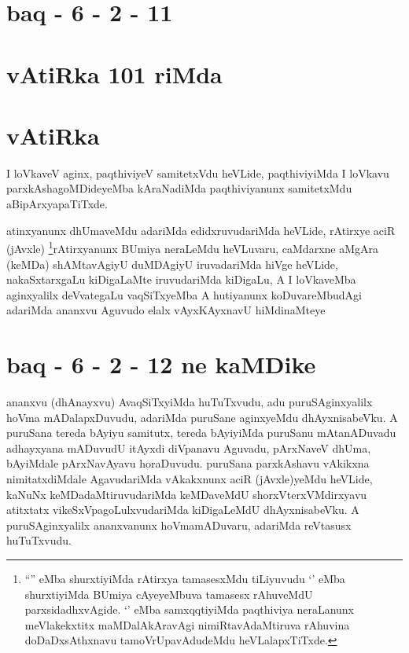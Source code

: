 
\section*{baq - 6 - 2 - 11}

\section*{vAtiRka 101 riMda}

\stext

\section*{vAtiRka}

\begin{artha}
I loVkaveV aginx, paqthiviyeV samitetxVdu heVLide, paqthiviyiMda I
loVkavu parxkAshagoMDideyeMba kAraNadiMda paqthiviyanunx samitetxMdu
aBipArxyapaTiTxde.
\end{artha}

\begin{artha}
atinxyanunx dhUmaveMdu adariMda edidxruvudariMda heVLide, rAtirxye
aciR (jAvxle) \footnote{``\stext'' eMba shurxtiyiMda rAtirxya
  tamasesxMdu tiLiyuvudu `\stext' eMba shurxtiyiMda BUmiya cAyeyeMbuva
tamasesx rAhuveMdU parxsidadhxvAgide. `\stext' eMba samxqqtiyiMda
paqthiviya neraLanunx meVlakekxtitx maMDalAkAravAgi nimiRtavAdaMtiruva
rAhuvina doDaDxsAthxnavu tamoVrUpavAdudeMdu heVLalapxTiTxde.}rAtirxyanunx BUmiya neraLeMdu heVLuvaru,
caMdarxne aMgAra (keMDa) shAMtavAgiyU duMDAgiyU iruvadariMda hiVge
heVLide, nakaSxtarxgaLu kiDigaLaMte iruvudariMda kiDigaLu, A I
loVkaveMba aginxyalilx deVvategaLu vaqSiTxyeMba A hutiyanunx
koDuvareMbudAgi adariMda ananxvu Aguvudo elalx vAyxKAyxnavU
hiMdinaMteye 
\end{artha}

\section*{baq - 6 - 2 - 12 ne kaMDike}

\stext

\begin{artha}
ananxvu (dhAnayxvu) AvaqSiTxyiMda huTuTxvudu, adu puruSAginxyalilx
hoVma mADalapxDuvudu, adariMda puruSane aginxyeMdu dhAyxnisabeVku. A
puruSana tereda bAyiyu samitutx, tereda bAyiyiMda puruSanu
mAtanADuvadu adhayxyana mADuvudU itAyxdi diVpanavu Aguvadu, pArxNaveV
dhUma, bAyiMdale pArxNavAyavu horaDuvudu. puruSana parxkAshavu
vAkikxna nimitatxdiMdale AgavudariMda vAkakxnunx aciR (jAvxle)yeMdu
heVLide, kaNuNx keMDadaMtiruvudariMda keMDaveMdU shorxVterxVMdirxyavu
atitxtatx vikeSxVpagoLulxvudariMda kiDigaLeMdU dhAyxnisabeVku. A
puruSAginxyalilx ananxvanunx hoVmamADuvaru, adariMda reVtasusx
huTuTxvudu. 
\stext
\end{artha}

